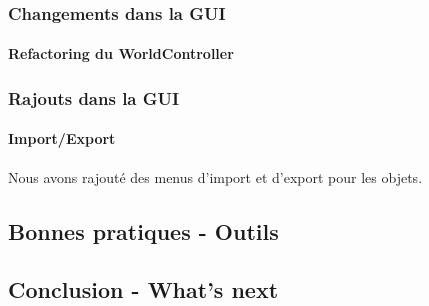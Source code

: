 	\subsubsection{Changements dans la GUI}

		\paragraph{Refactoring du WorldController}

	\subsubsection{Rajouts dans la GUI}

		\paragraph{Import/Export}
		Nous avons rajouté des menus d'import et d'export pour les objets.


\subsection{Bonnes pratiques - Outils}


\subsection{Conclusion - What's next}

